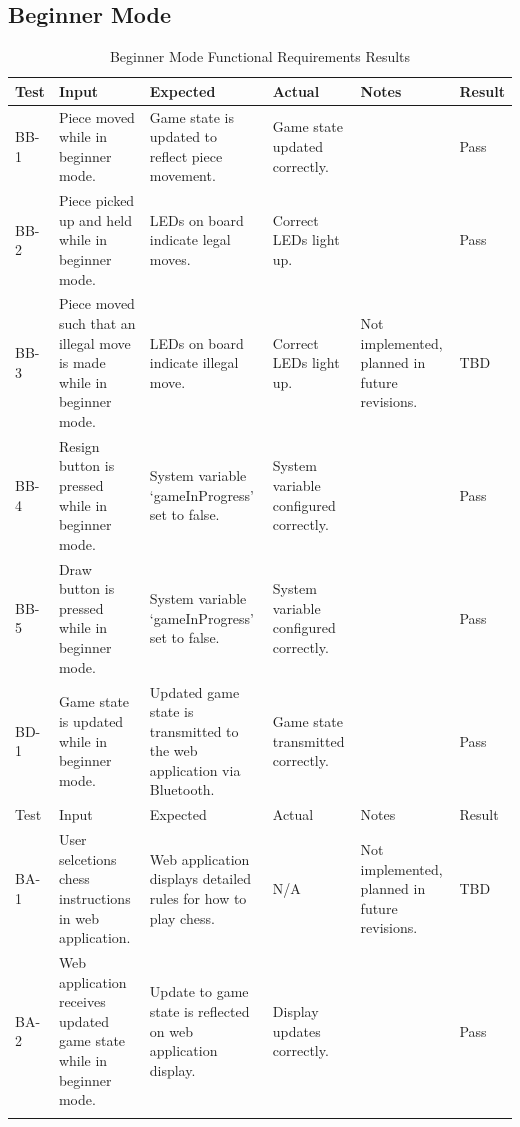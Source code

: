 \documentclass[12pt, titlepage]{article}
\begin{document}
\pagebreak

\subsection{Beginner Mode}
    \begin{longtable}{| >{\centering\arraybackslash}m{1cm} | 
        >{\centering\arraybackslash}m{2.5cm} | 
        >{\centering\arraybackslash}m{4cm} | 
        >{\centering\arraybackslash}m{3cm} |
        >{\centering\arraybackslash}m{3cm} |
        >{\centering\arraybackslash}m{1.5cm} |}
    \hline
    \rowcolor[gray]{0.9}
    Test & Input & Expected & Actual & Notes & Result\\
    \hline
    BB-1 & Piece moved while in beginner mode. & Game state is updated to reflect piece movement. & Game state updated correctly. &  & Pass \\
    \hline
    BB-2 & Piece picked up and held while in beginner mode. & LEDs on board indicate legal moves. & Correct LEDs light up. &  & Pass \\
    \hline
    BB-3 & Piece moved such that an illegal move is made while in beginner mode. & LEDs on board indicate illegal move. & Correct LEDs light up. & Not implemented, planned in future revisions. & TBD \\
    \hline
    BB-4 & Resign button is pressed while in beginner mode. & System variable `gameInProgress' set to false. & System variable configured correctly. &  & Pass \\
    \hline
    BB-5 & Draw button is pressed while in beginner mode. & System variable `gameInProgress' set to false. & System variable configured correctly. &  & Pass \\
    \hline
    BD-1 & Game state is updated while in beginner mode. & Updated game state is transmitted to the web application via Bluetooth. & Game state transmitted correctly. &  & Pass \\
    \hline
    \pagebreak 
    \hline
    \rowcolor[gray]{0.9}
    Test & Input & Expected & Actual & Notes & Result\\
    \hline
    BA-1 & User selcetions chess instructions in web application. & Web application displays detailed rules for how to play chess. & N/A & Not implemented, planned in future revisions. & TBD \\
    \hline
    BA-2 & Web application receives updated game state while in beginner mode. & Update to game state is reflected on web application display. & Display updates correctly. &  & Pass \\
    \hline
    \caption{Beginner Mode Functional Requirements Results}\\
\end{longtable}
    
\end{document}
